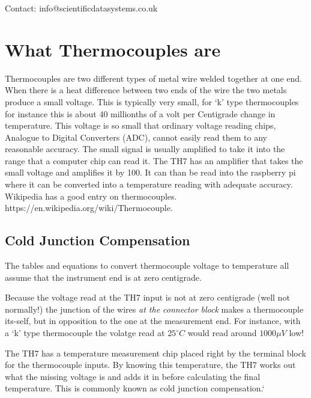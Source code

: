 \documentclass[10pt,foldmark]{leaflet}
\begin{document}

\vspace{0.5cm}
Contact: info@scientificdatasystems.co.uk

\clearpage

\section{What Thermocouples are}

Thermocouples are two different types of metal wire welded together
at one end.
When there is a heat difference between two ends of the wire
the two metals produce a small voltage.
This is typically very small, for `k' type thermocouples for instance
this is about 40 millionths of a volt per Centigrade change in temperature.
%
This voltage is so small that ordinary voltage reading chips, Analogue to Digital Converters (ADC),  cannot easily read them
to any reasonable accuracy.
%
The small signal is usually amplified
to take it into the range that a computer chip can read it.
The TH7 has an amplifier that takes the small voltage and amplifies it by 100.
It can than be read into the raspberry pi where it can be converted into
a temperature reading with adequate accuracy.
Wikipedia has a good entry on thermocouples.
https://en.wikipedia.org/wiki/Thermocouple.

\subsection{Cold Junction Compensation}

The tables and equations to convert thermocouple voltage to
temperature all assume that the instrument end is at zero centigrade.

Because the voltage read at the TH7 input is not at zero centigrade (well not normally!)
the junction of the wires {\em at the connector block}  makes a thermocouple its-self, but in opposition to
the one at the measurement end. For instance, with a `k' type thermocouple
the volatge read at $25^\circ C$ would read around $1000 \mu V$ low!

The TH7 has a temperature measurement chip placed right by the terminal block for the thermocouple inputs.
By knowing this temperature, the TH7 works out what the missing voltage is
and adds it in before calculating the final temperature. This is commonly known as cold junction compensation.`
\end{document}
